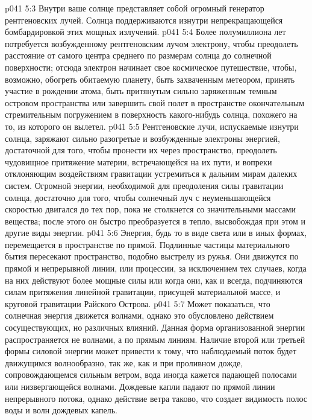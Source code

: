 \vs p041 5:3 Внутри ваше солнце представляет собой огромный генератор рентгеновских лучей. Солнца поддерживаются изнутри непрекращающейся бомбардировкой этих мощных излучений.
\vs p041 5:4 Более полумиллиона лет потребуется возбужденному рентгеновским лучом электрону, чтобы преодолеть расстояние от самого центра среднего по размерам солнца до солнечной поверхности; отсюда электрон начинает свое космическое путешествие, чтобы, возможно, обогреть обитаемую планету, быть захваченным метеором, принять участие в рождении атома, быть притянутым сильно заряженным темным островом пространства или завершить свой полет в пространстве окончательным стремительным погружением в поверхность какого\hyp{}нибудь солнца, похожего на то, из которого он вылетел.
\vs p041 5:5 Рентгеновские лучи, испускаемые изнутри солнца, заряжают сильно разогретые и возбужденные электроны энергией, достаточной для того, чтобы пронести их через пространство, преодолеть чудовищное притяжение материи, встречающейся на их пути, и вопреки отклоняющим воздействиям гравитации устремиться к дальним мирам далеких систем. Огромной энергии, необходимой для преодоления силы гравитации солнца, достаточно для того, чтобы солнечный луч с неуменьшающейся скоростью двигался до тех пор, пока не столкнется со значительными массами вещества; после этого он быстро преобразуется в тепло, высвобождая при этом и другие виды энергии.
\vs p041 5:6 \pc Энергия, будь то в виде света или в иных формах, перемещается в пространстве по прямой. Подлинные частицы материального бытия пересекают пространство, подобно выстрелу из ружья. Они движутся по прямой и непрерывной линии, или процессии, за исключением тех случаев, когда на них действуют более мощные силы или когда они, как и всегда, подчиняются силам притяжения линейной гравитации, присущей материальной массе, и круговой гравитации Райского Острова.
\vs p041 5:7 \pc Может показаться, что солнечная энергия движется волнами, однако это обусловлено действием сосуществующих, но различных влияний. Данная форма организованной энергии распространяется не волнами, а по прямым линиям. Наличие второй или третьей формы силовой энергии может привести к тому, что наблюдаемый поток будет  движущимся волнообразно, так же, как и при проливном дожде, сопровождающемся сильным ветром, вода иногда кажется падающей полосами или низвергающейся волнами. Дождевые капли падают по прямой линии непрерывного потока, однако действие ветра таково, что создает видимость полос воды и волн дождевых капель.
